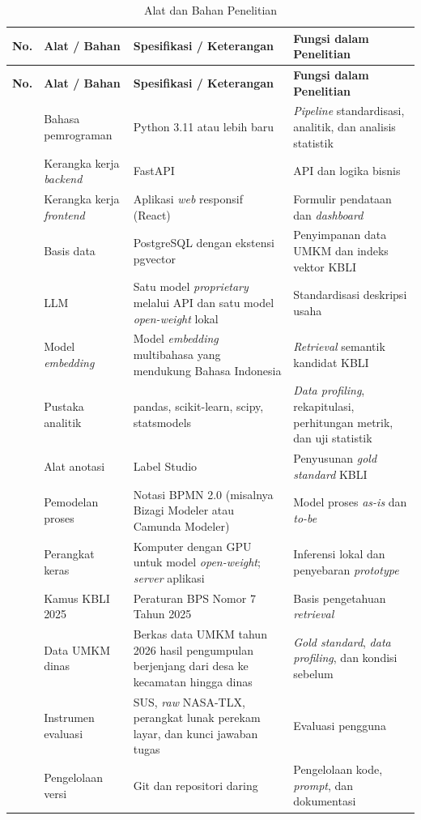 {\footnotesize
\setlength{\tabcolsep}{4pt}
\renewcommand{\arraystretch}{1.15}
\begin{longtable}{|>{\centering\arraybackslash}p{}|L{0.24\textwidth}|L{0.30\textwidth}|L{0.32\textwidth}|}
\caption{Alat dan Bahan Penelitian}
\label{tab:tools}\\
\hline
\textbf{No.} & \textbf{Alat / Bahan} & \textbf{Spesifikasi / Keterangan} & \textbf{Fungsi dalam Penelitian} \\ \hline
\endfirsthead
\hline
\textbf{No.} & \textbf{Alat / Bahan} & \textbf{Spesifikasi / Keterangan} & \textbf{Fungsi dalam Penelitian} \\ \hline
{} & Bahasa pemrograman & Python 3.11 atau lebih baru & \textit{Pipeline} standardisasi, analitik, dan analisis statistik \\  & Kerangka kerja \textit{backend} & FastAPI & API dan logika bisnis \\  & Kerangka kerja \textit{frontend} & Aplikasi \textit{web} responsif (React) & Formulir pendataan dan \textit{dashboard} \\  & Basis data & PostgreSQL dengan ekstensi pgvector & Penyimpanan data UMKM dan indeks vektor KBLI \\  & LLM & Satu model \textit{proprietary} melalui API dan satu model \textit{open-weight} lokal & Standardisasi deskripsi usaha \\  & Model \textit{embedding} & Model \textit{embedding} multibahasa yang mendukung Bahasa Indonesia & \textit{Retrieval} semantik kandidat KBLI \\  & Pustaka analitik & pandas, scikit-learn, scipy, statsmodels & \textit{Data profiling}, rekapitulasi, perhitungan metrik, dan uji statistik \\  & Alat anotasi & Label Studio & Penyusunan \textit{gold standard} KBLI \\  & Pemodelan proses & Notasi BPMN 2.0 (misalnya Bizagi Modeler atau Camunda Modeler) & Model proses \textit{as-is} dan \textit{to-be} \\  & Perangkat keras & Komputer dengan GPU untuk model \textit{open-weight}; \textit{server} aplikasi & Inferensi lokal dan penyebaran \textit{prototype} \\  & Kamus KBLI 2025 & Peraturan BPS Nomor 7 Tahun 2025 \cite{bps2025perban7} & Basis pengetahuan \textit{retrieval} \\  & Data UMKM dinas & Berkas data UMKM tahun 2026 hasil pengumpulan berjenjang dari desa ke kecamatan hingga dinas & \textit{Gold standard}, \textit{data profiling}, dan kondisi sebelum \\  & Instrumen evaluasi & SUS, \textit{raw} NASA-TLX, perangkat lunak perekam layar, dan kunci jawaban tugas & Evaluasi pengguna \\  & Pengelolaan versi & Git dan repositori daring & Pengelolaan kode, \textit{prompt}, dan dokumentasi \\ \hline
\end{longtable}
}

